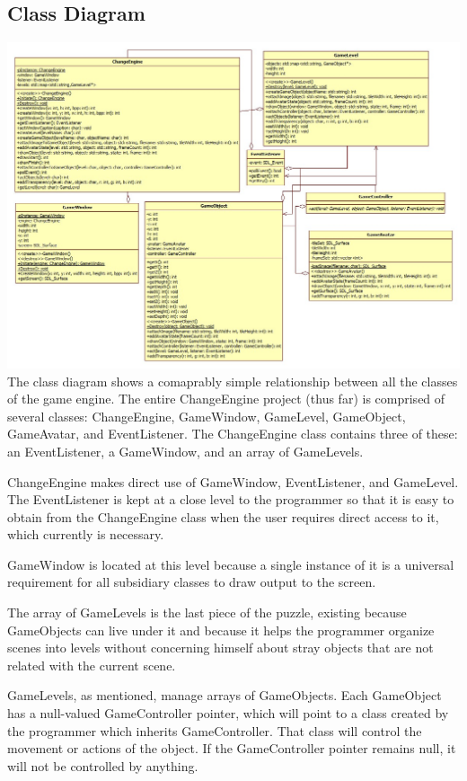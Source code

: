 \documentclass[12pt]{article}
\begin{document}
\subsection{Class Diagram}

\hspace*{-1in}
\includegraphics[width=7in]{class-diagram.jpg}
\\
The class diagram shows a comaprably simple relationship between all the classes of the game engine. The entire ChangeEngine project (thus far) is comprised of several classes: ChangeEngine, GameWindow, GameLevel, GameObject, GameAvatar, and EventListener. The ChangeEngine class contains three of these: an EventListener, a GameWindow, and an array of GameLevels.

ChangeEngine makes direct use of GameWindow, EventListener, and GameLevel. The EventListener is kept at a close level to the programmer so that it is easy to obtain from the ChangeEngine class when the user requires direct access to it, which currently is necessary.

GameWindow is located at this level because a single instance of it is a universal requirement for all subsidiary classes to draw output to the screen.

The array of GameLevels is the last piece of the puzzle, existing because GameObjects can live under it and because it helps the programmer organize scenes into levels without concerning himself about stray objects that are not related with the current scene.

GameLevels, as mentioned, manage arrays of GameObjects. Each GameObject has a null-valued GameController pointer, which will point to a class created by the programmer which inherits GameController. That class will control the movement or actions of the object. If the GameController pointer remains null, it will not be controlled by anything.
\end{document}
